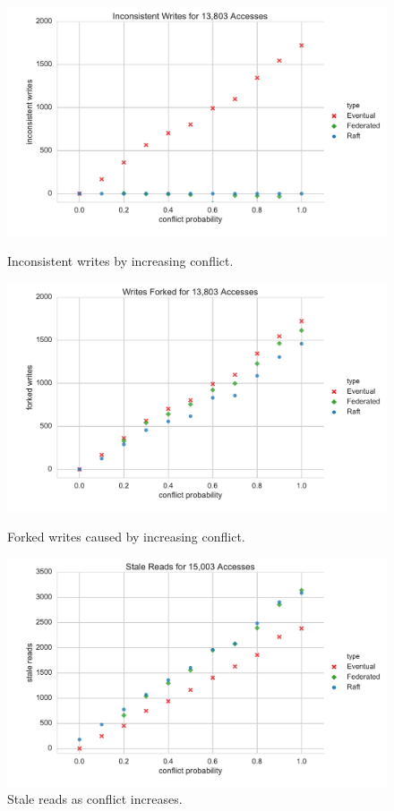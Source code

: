 \documentclass[10pt,conference,letterpaper]{IEEEtran}
\begin{document}
\begin{figure}
    \centering
      \includegraphics[width=\linewidth]{figures/conflict/inconsistent_writes}
      \caption{Inconsistent writes by increasing conflict.}\label{fig:inconsistent_writes}
    \endminipage\hfill
      \includegraphics[width=\linewidth]{figures/conflict/forked_writes}
      \caption{Forked writes caused by increasing conflict.}\label{fig:forked_writes}
    \endminipage\hfill
      \includegraphics[width=\linewidth]{figures/conflict/stale_reads}
      \caption{Stale reads as conflict increases.}\label{fig:stale_reads}
    \endminipage
\end{figure}
\end{document}
